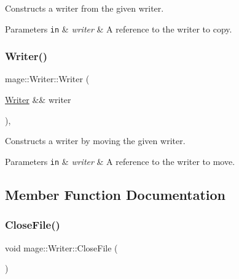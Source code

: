 Constructs a writer from the given writer.


\begin{DoxyParams}[1]{Parameters}
\mbox{\tt in}  & {\em writer} & A reference to the writer to copy. \\
\hline
\end{DoxyParams}
\hypertarget{classmage_1_1_writer_a3b55e6b0202cdf8fb582c900c493b3fe}{}\label{classmage_1_1_writer_a3b55e6b0202cdf8fb582c900c493b3fe} 
\subsubsection{\texorpdfstring{Writer()}{Writer()}\hspace{0.1cm}{\footnotesize\ttfamily [3/3]}}
{\footnotesize\ttfamily mage\+::\+Writer\+::\+Writer (\begin{DoxyParamCaption}\item[{\hyperlink{classmage_1_1_writer}{Writer} \&\&}]{writer }\end{DoxyParamCaption})\hspace{0.3cm}{\ttfamily [protected]}, {\ttfamily [default]}}

Constructs a writer by moving the given writer.


\begin{DoxyParams}[1]{Parameters}
\mbox{\tt in}  & {\em writer} & A reference to the writer to move. \\
\hline
\end{DoxyParams}


\subsection{Member Function Documentation}
\hypertarget{classmage_1_1_writer_a82455a4fd68a97a4f1f48b90e43539e6}{}\label{classmage_1_1_writer_a82455a4fd68a97a4f1f48b90e43539e6} 
\subsubsection{\texorpdfstring{Close\+File()}{CloseFile()}}
{\footnotesize\ttfamily void mage\+::\+Writer\+::\+Close\+File (\begin{DoxyParamCaption}{ }\end{DoxyParamCaption})\hspace{0.3cm}{\ttfamily [private]}}

